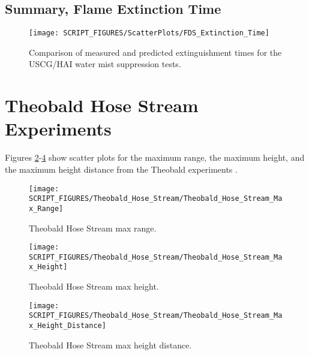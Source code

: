 \clearpage

\subsection{Summary, Flame Extinction Time}
\label{Extinction Time}

\begin{figure}[h!]
\begin{center}
\texttt{[image: SCRIPT\_FIGURES/ScatterPlots/FDS\_Extinction\_Time]}
\caption[Extinguishment times for the USCG/HAI water mist suppression tests]{Comparison of measured and predicted extinguishment times for the USCG/HAI water mist suppression tests.}
\label{USCG_Scatter}
\end{center}
\end{figure}

\clearpage

\section{Theobald Hose Stream Experiments}

Figures \ref{fig:Theobald_max_range}-\ref{fig:Theobald_max_height_distance} show scatter plots for the maximum range, the maximum height, and the maximum height distance from the Theobald experiments \cite{Theobald:1981}.

\begin{figure}[h!]
\begin{center}
\texttt{[image: SCRIPT\_FIGURES/Theobald\_Hose\_Stream/Theobald\_Hose\_Stream\_Max\_Range]}
\caption[Theobald Hose Stream max range]{Theobald Hose Stream max range.}
\label{fig:Theobald_max_range}
\end{center}
\end{figure}

\begin{figure}[h!]
\begin{center}
\texttt{[image: SCRIPT\_FIGURES/Theobald\_Hose\_Stream/Theobald\_Hose\_Stream\_Max\_Height]}
\caption[Theobald Hose Stream max range]{Theobald Hose Stream max height.}
\label{fig:Theobald_max_height}
\end{center}
\end{figure}

\begin{figure}[h!]
\begin{center}
\texttt{[image: SCRIPT\_FIGURES/Theobald\_Hose\_Stream/Theobald\_Hose\_Stream\_Max\_Height\_Distance]}
\caption[Theobald Hose Stream max range]{Theobald Hose Stream max height distance.}
\label{fig:Theobald_max_height_distance}
\end{center}
\end{figure}


